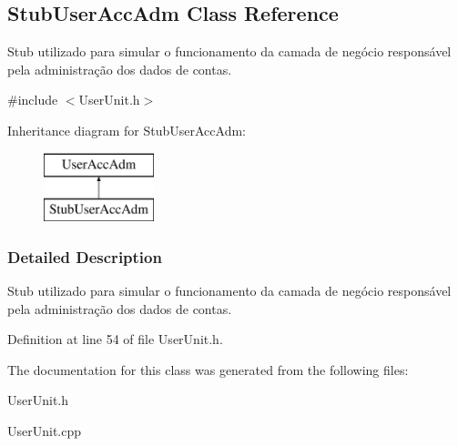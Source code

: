 \hypertarget{classStubUserAccAdm}{\subsection{Stub\-User\-Acc\-Adm Class Reference}
\label{d3/d88/classStubUserAccAdm}
}


Stub utilizado para simular o funcionamento da camada de negócio responsável pela administração dos dados de contas.  




{\ttfamily \#include $<$User\-Unit.\-h$>$}

Inheritance diagram for Stub\-User\-Acc\-Adm\-:\begin{figure}[H]
\begin{center}
\leavevmode
\includegraphics[height=2.000000cm]{d3/d88/classStubUserAccAdm}
\end{center}
\end{figure}


\subsubsection{Detailed Description}
Stub utilizado para simular o funcionamento da camada de negócio responsável pela administração dos dados de contas. 

Definition at line 54 of file User\-Unit.\-h.



The documentation for this class was generated from the following files\-:\begin{DoxyCompactItemize}
\item 
User\-Unit.\-h\item 
User\-Unit.\-cpp\end{DoxyCompactItemize}
